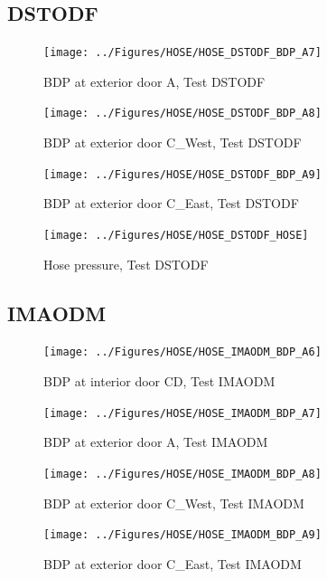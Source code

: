 \documentclass[11pt,oneside]{book}
\begin{document}
\subsection{DSTODF}

\begin{figure}[!ht]
\texttt{[image: ../Figures/HOSE/HOSE\_DSTODF\_BDP\_A7]}
\caption{BDP at exterior door A, Test DSTODF}
\label{fig:HOSE_DSTODF_BDP_A7}
\end{figure}

\begin{figure}[!ht]
\texttt{[image: ../Figures/HOSE/HOSE\_DSTODF\_BDP\_A8]}
\caption{BDP at exterior door C\_West, Test DSTODF}
\label{fig:HOSE_DSTODF_BDP_A8}
\end{figure}

\begin{figure}[!ht]
\texttt{[image: ../Figures/HOSE/HOSE\_DSTODF\_BDP\_A9]}
\caption{BDP at exterior door C\_East, Test DSTODF}
\label{fig:HOSE_DSTODF_BDP_A9}
\end{figure}

\begin{figure}[!ht]
\texttt{[image: ../Figures/HOSE/HOSE\_DSTODF\_HOSE]}
\caption{Hose pressure, Test DSTODF}
\label{fig:HOSE_DSTODF_HOSE}
\end{figure}


\clearpage


\subsection{IMAODM}

\begin{figure}[!ht]
\texttt{[image: ../Figures/HOSE/HOSE\_IMAODM\_BDP\_A6]}
\caption{BDP at interior door CD, Test IMAODM}
\label{fig:HOSE_IMAODM_BDP_A6}
\end{figure}

\begin{figure}[!ht]
\texttt{[image: ../Figures/HOSE/HOSE\_IMAODM\_BDP\_A7]}
\caption{BDP at exterior door A, Test IMAODM}
\label{fig:HOSE_IMAODM_BDP_A7}
\end{figure}

\begin{figure}[!ht]
\texttt{[image: ../Figures/HOSE/HOSE\_IMAODM\_BDP\_A8]}
\caption{BDP at exterior door C\_West, Test IMAODM}
\label{fig:HOSE_IMAODM_BDP_A8}
\end{figure}

\begin{figure}[!ht]
\texttt{[image: ../Figures/HOSE/HOSE\_IMAODM\_BDP\_A9]}
\caption{BDP at exterior door C\_East, Test IMAODM}
\label{fig:HOSE_IMAODM_BDP_A9}
\end{figure}
\end{document}
